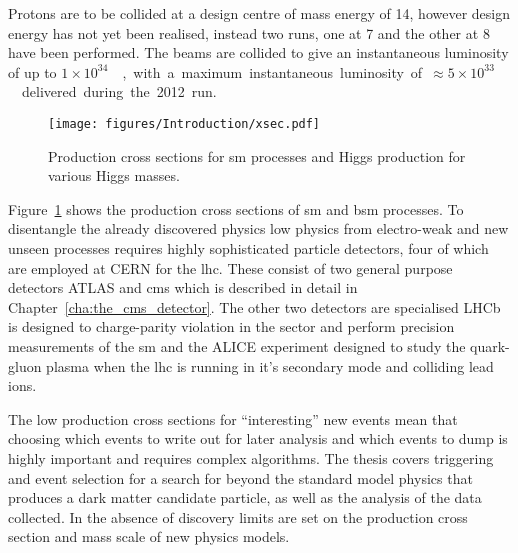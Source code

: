 Protons are to be collided at a design centre of mass energy of 
\unit{14}{\TeV}, however design energy has not yet been realised, instead two 
runs, one at \unit{7}{\TeV} and the other at \unit{8}{\TeV} have been 
performed. The beams are collided to give an instantaneous luminosity of up to 
\unit{$1\times10^{34}$}{\lumiunits}, with a maximum instantaneous luminosity of 
\unit{$\approx 5 \times 10^{33}$}{\lumiunits} delivered during the 2012 run.



\begin{figure}[ht]
  \centering
    \texttt{[image: figures/Introduction/xsec.pdf]}
  \caption{Production cross sections for \ac{sm} processes and Higgs production for various Higgs masses.}
  \label{fig:figures_Introduction_xsec}
\end{figure}

Figure~\ref{fig:figures_Introduction_xsec} shows the production cross sections 
of \ac{sm} and \ac{bsm} processes. To disentangle the already discovered 
physics low \pt physics from electro-weak and new unseen processes requires 
highly sophisticated particle detectors, four of which are employed at CERN for 
the \ac{lhc}. These consist of two general purpose detectors 
ATLAS\cite{ref:atlas} and \ac{cms}\cite{ref:cms} which is described in detail 
in Chapter~\ref{cha:the_cms_detector}. The other two detectors are specialised 
LHCb\cite{ref:lhcb} is designed to charge-parity violation in the \Pbottom 
sector and perform precision measurements of the \ac{sm} and the 
ALICE\cite{ref:alice} experiment designed to study the quark-gluon plasma when 
the \ac{lhc} is running in it's secondary mode and colliding lead ions.


The low production cross sections for ``interesting'' new events mean that 
choosing which events to write out for later analysis and which events to dump 
is highly important and requires complex algorithms. The thesis covers 
triggering and event selection for a search for beyond the standard model 
physics that produces a dark matter candidate particle, as well as the analysis 
of the data collected. In the absence of discovery limits are set on the 
production cross section and mass scale of new physics models.

















